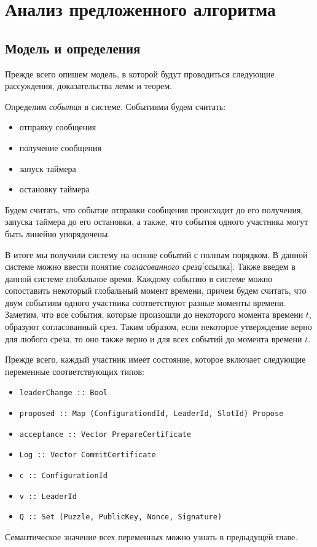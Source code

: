 
\chapter{Анализ предложенного алгоритма}  \label{chapter3}

\section{Модель и определения}
Прежде всего опишем модель, в которой будут проводиться следующие рассуждения, доказательства лемм и теорем.

Определим \textit{события} в системе. Событиями будем считать:
\begin{itemize}
\item отправку сообщения
\item получение сообщения
\item запуск таймера
\item остановку таймера
\end{itemize}

Будем считать, что событие отправки сообщения происходит до его получения, запуска таймера до его остановки, а также, что события одного участника могут быть линейно упорядочены.

В итоге мы получили систему на основе событий с полным порядком. В данной системе можно ввести понятие \textit{согласованного среза}[ссылка]. Также введем в данной системе глобальное время. Каждому событию в системе можно сопоставить некоторый глобальный момент времени, причем будем считать, что двум событиям одного участника соответствуют разные моменты времени. Заметим, что все события, которые произошли до некоторого момента времени $t$, образуют согласованный срез. Таким образом, если некоторое утверждение верно для любого среза, то оно также верно и для всех событий до момента времени $t$.

Прежде всего, каждый участник имеет состояние, которое включает следующие переменные соответствующих типов:
\begin{itemize}
\item \texttt{leaderChange :: Bool}
\item \texttt{proposed :: Map (ConfigurationdId, LeaderId, SlotId) Propose}
\item \texttt{acceptance :: Vector PrepareCertificate}
\item \texttt{Log      :: Vector CommitCertificate}
\item \texttt{c          :: ConfigurationId}
\item \texttt{v          :: LeaderId}
\item \texttt{Q         :: Set (Puzzle, PublicKey, Nonce, Signature)}
\end{itemize}
Семантическое значение всех переменных можно узнать в предыдущей главе.


